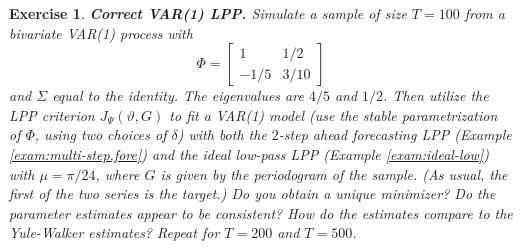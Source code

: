 \documentclass[a4paper]{book}
\newtheorem{Exercise}{Exercise}
\begin{document}




\begin{Exercise} {\bf Correct VAR(1) LPP.} \rm
\label{exer:var1lpp-correct}
 Simulate a sample of size $T=100$ from a
  bivariate VAR(1) process with 
\[
  \Phi = \left[ \begin{array}{cc} 1 & 1/2 \\ -1/5 & 3/10 \end{array} \right]
\]
 and $\Sigma$ equal to the identity.  The eigenvalues are $4/5$ and $1/2$.
 Then utilize the LPP criterion $J_{\Psi} (\vartheta, G)$ to fit a VAR(1) model (use
  the stable parametrization of $\Phi$, using two choices of $\delta$) with both 
 the $2$-step ahead forecasting LPP (Example \ref{exam:multi-step.fore}) and the 
 ideal low-pass  LPP (Example \ref{exam:ideal-low}) with 
  $\mu = \pi/24$, where $G$ is given by the periodogram of the sample.
 (As usual, the first of the two series is the target.)
 Do you obtain a unique minimizer?    Do the parameter estimates appear to be consistent? 
  How do the estimates compare to the Yule-Walker estimates?
 Repeat for $T=200$ and $T=500$.
\end{Exercise}
\end{document}
